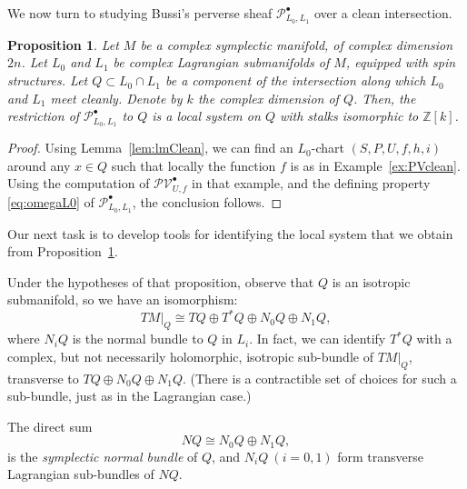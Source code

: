 \documentclass [11pt]{amsart}
\newtheorem {proposition}[theorem]{Proposition}
\theoremstyle{remark}
\def\zz {{\mathbb{Z}}}
\def\Z {\zz}
\def\Pb {\mathcal{P}^\bullet}
\def\PVb {\mathcal{PV}^\bullet}
\begin{document}
We now turn to studying Bussi's perverse sheaf $\Pb_{L_0, L_1}$ over a clean intersection.

\begin{proposition}
\label{prop:BClean}
Let $M$ be a complex symplectic manifold, of complex dimension $2n$. Let $L_0$ and $L_1$ be complex Lagrangian submanifolds of $M$, equipped with spin structures. Let $Q \subset L_0 \cap L_1$ be a component of the intersection along which $L_0$ and $L_1$ meet cleanly. Denote by $k$ the complex dimension of $Q$. Then, the restriction of $\Pb_{L_0, L_1}$ to $Q$ is a local system on $Q$ with stalks isomorphic to $\Z[k]$.
\end{proposition}

\begin{proof}
Using Lemma~\ref{lem:lmClean}, we can find an $L_0$-chart $(S, P, U, f, h, i)$ around any $x \in Q$ such that locally the function $f$ is as in Example~\ref{ex:PVclean}. Using the computation of $\PVb_{U,f}$ in that example, and the defining property \eqref{eq:omegaL0} of $\Pb_{L_0, L_1}$, the conclusion follows.
\end{proof}

Our next task is to develop tools for identifying the local system that we obtain from Proposition~\ref{prop:BClean}. 

Under the hypotheses of that proposition, observe that $Q$ is an isotropic submanifold, so we have an isomorphism:
\begin{equation}
  TM|_Q \cong T Q \oplus T^*Q \oplus  N_0 Q \oplus N_1 Q,
\end{equation}
where $N_iQ$ is the normal bundle to $Q$ in $L_i$. In fact, we can identify $T^*Q$ with a complex, but not necessarily holomorphic, isotropic sub-bundle of $TM|_Q$, transverse to $TQ \oplus N_0 Q \oplus N_1 Q.$ (There is a contractible set of choices for such a sub-bundle, just as in the Lagrangian case.)

The direct sum
\begin{equation}
N Q \cong   N_0 Q \oplus N_1 Q,
\end{equation}
is the \emph{symplectic normal bundle} of $Q$, and $N_i Q \ (i=0,1)$ form transverse Lagrangian sub-bundles of $NQ$.
\end{document}
